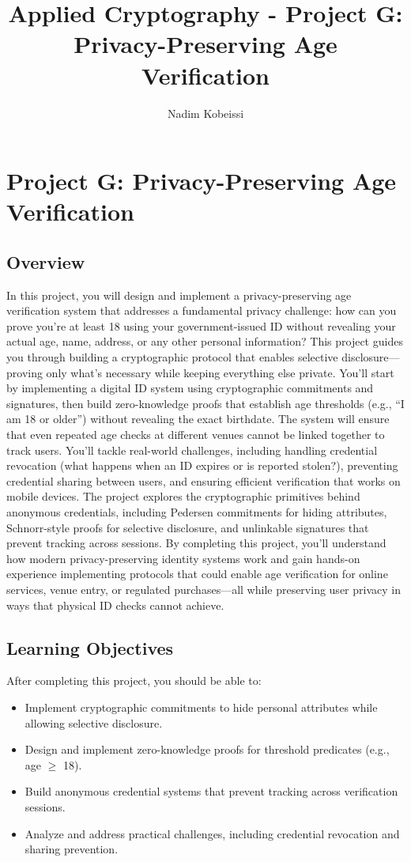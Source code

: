 \documentclass[10pt,a4paper,american]{exam}
\title{Applied Cryptography - Project G: Privacy-Preserving Age Verification}
\author{Nadim Kobeissi}
\begin{document}
\classhandoutheader
\section*{Project G: Privacy-Preserving Age Verification}

\subsection*{Overview}
In this project, you will design and implement a privacy-preserving age verification system that addresses a fundamental privacy challenge: how can you prove you're at least 18 using your government-issued ID without revealing your actual age, name, address, or any other personal information? This project guides you through building a cryptographic protocol that enables selective disclosure—proving only what's necessary while keeping everything else private. You'll start by implementing a digital ID system using cryptographic commitments and signatures, then build zero-knowledge proofs that establish age thresholds (e.g., ``I am 18 or older'') without revealing the exact birthdate. The system will ensure that even repeated age checks at different venues cannot be linked together to track users. You'll tackle real-world challenges, including handling credential revocation (what happens when an ID expires or is reported stolen?), preventing credential sharing between users, and ensuring efficient verification that works on mobile devices. The project explores the cryptographic primitives behind anonymous credentials, including Pedersen commitments for hiding attributes, Schnorr-style proofs for selective disclosure, and unlinkable signatures that prevent tracking across sessions. By completing this project, you'll understand how modern privacy-preserving identity systems work and gain hands-on experience implementing protocols that could enable age verification for online services, venue entry, or regulated purchases—all while preserving user privacy in ways that physical ID checks cannot achieve.

\subsection*{Learning Objectives}
After completing this project, you should be able to:
\begin{itemize}
	\item Implement cryptographic commitments to hide personal attributes while allowing selective disclosure.
	\item Design and implement zero-knowledge proofs for threshold predicates (e.g., age $\geq$ 18).
	\item Build anonymous credential systems that prevent tracking across verification sessions.
	\item Analyze and address practical challenges, including credential revocation and sharing prevention.
\end{itemize}
\end{document}
